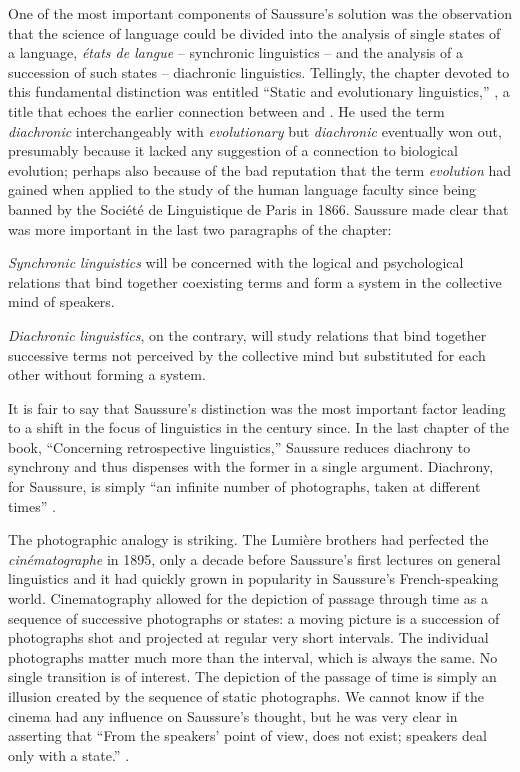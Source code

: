 \documentclass[output=paper,
modfonts
]{LSP/langsci}
\begin{document}
One of the most important components of Saussure's solution was the observation that the science of language could be divided into the analysis of single states of a language, \textit{états de langue} -- synchronic linguistics -- and the analysis of a succession of such states -- diachronic linguistics. Tellingly, the chapter devoted to this fundamental distinction was entitled ``Static and evolutionary linguistics,'' \citep[79]{Saussure1959}, a title that echoes the earlier connection between  and . He used the term \textit{diachronic} interchangeably with \textit{evolutionary} but \textit{diachronic} eventually won out, presumably because it lacked any suggestion of a connection to biological evolution; perhaps also because of the bad reputation that the term \textit{evolution} had gained when applied to the study of the human language faculty since being banned by the Société de Linguistique de Paris in 1866.  Saussure made clear that  was more important in the last two paragraphs of the chapter:

\textit{Synchronic linguistics} will be concerned with the logical and psychological relations that bind together coexisting terms and form a system in the collective mind of speakers.

\textit{Diachronic linguistics}, on the contrary, will study relations that bind together successive terms not perceived by the collective mind but substituted for each other without forming a system.

It is fair to say that Saussure's distinction was the most important factor leading to a shift in the focus of linguistics in the century since.  In the last chapter of the book, ``Concerning retrospective linguistics,'' Saussure reduces diachrony to synchrony and thus dispenses with the former in a single argument.  Diachrony, for Saussure, is simply ``an infinite number of photographs, taken at different times'' \citep[212]{Saussure1959}.

The photographic analogy is striking.  The Lumière brothers had perfected the \textit{cinématographe} in 1895, only a decade before Saussure's first lectures on general linguistics and it had quickly grown in popularity in Saussure's French-speaking world. Cinematography allowed for the depiction of passage through time as a sequence of successive photographs or states: a moving picture is a succession of photographs shot and projected at regular very short intervals. The individual photographs matter much more than the interval, which is always the same.  No single transition is of interest. The depiction of the passage of time is simply an illusion created by the sequence of static photographs. We cannot know if the cinema had any influence on Saussure's thought, but he was very clear in asserting that ``From the speakers' point of view,  does not exist; speakers deal only with a state.'' \citep[594]{Joseph2012}.
\end{document}
